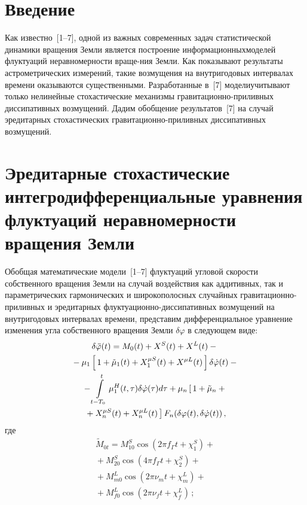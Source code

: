       \begin{multicols}{2}

      \label{st\stat}
   

\section{Введение}

Как известно~[1--7], одной из важных современных задач
статистической динамики вращения Земли является построение
информационных\linebreak моделей флуктуаций неравномерности враще-\linebreak ния Земли.
Как показывают результаты астрометрических измерений, такие
возмущения на внутригодовых интервалах времени оказываются
\mbox{существенными}. Разработанные в~[7] модели\linebreak учитывают только
нелинейные стохастические механизмы гравитационно-при\-лив\-ных
диссипативных возмущений. Дадим обобщение результатов~[7] на случай
эредитарных стохастических гравитационно-приливных диссипативных
возмущений.

\section{Эредитарные стохастические интегродифференциальные уравнения 
флуктуаций неравномерности вращения Земли}

Обобщая математические модели~[1--7]  флуктуаций угловой скорости
собственного вращения Земли на случай воздействия как аддитивных,
так и параметрических гармонических и широкополосных случайных
гравитационно-приливных и эредитарных флуктуационно-диссипативных
возмущений на внутригодовых интервалах времени, представим
дифференциальное уравнение изменения угла собственного вращения
Земли $\delta \varphi$ в сле\-ду\-ющем виде:
\begin{multline}
\delta \ddot\varphi (t) = M_{0} (t) +X^S(t) + X^L(t) -{}\\
{}-\mu_1 \left[\, 1+ \tilde \mu_1 (t) + X_1^{\mu S} (t) + X^{\mu L} (t)\,\right] \delta \dot \varphi(t)-{}\\
{}-
    \int\limits_{t-T_0}^t \mu_1^H (t,\tau) \delta\dot\varphi (\tau) d\tau+
 \mu_n \left[\, 1+ \tilde \mu_n +{}\right.\\
\left. {}+ X^{\mu S}_n (t) + X_n^{\mu L} (t)\,\right] F_n (\delta\varphi(t),
    \delta\dot\varphi(t))\,,
\label{e1s}
\end{multline}
где
    \begin{multline}
\tilde M_{0t} = M_{10}^S \cos\left( 2\pi f_\Gamma t +\chi_1^S\right)+{}\\[3pt]
{}+M_{20}^S
    \cos\left( 4\pi f_\Gamma t +\chi_2^S\right)+{}\\[3pt]
{}+M_{m0}^L \cos\left(2\pi \nu_m t +\chi_m^L\right)+{}\\[3pt]
{}+ M_{f0}^L
    \cos\left( 2\pi \nu_f t+\chi_f^L\right )\,;\label{e2s}
    \end{multline}
    \vspace*{-24pt}
    

\end{multicols}
